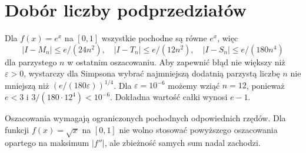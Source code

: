 \section{Dobór liczby podprzedziałów}
\begin{przyklad}
\label{ma1:ex:quadrature-exp}
Dla $f(x)=e^x$ na $[0,1]$ wszystkie pochodne są równe $e^x$, więc
\[
 |I-M_n|\le e/(24n^2),\quad
 |I-T_n|\le e/(12n^2),\quad
 |I-S_n|\le e/(180n^4)
\]
dla parzystego $n$ w ostatnim oszacowaniu. Aby zapewnić błąd nie większy niż $\varepsilon>0$, wystarczy dla Simpsona wybrać najmniejszą dodatnią parzystą liczbę $n$ nie mniejszą niż $(e/(180\varepsilon))^{1/4}$. Dla $\varepsilon=10^{-6}$ możemy wziąć $n=12$, ponieważ $e<3$ i $3/(180\cdot12^4)<10^{-6}$. Dokładna wartość całki wynosi $e-1$.
\end{przyklad}
Oszacowania wymagają ograniczonych pochodnych odpowiednich rzędów. Dla funkcji $f(x)=\sqrt x$ na $[0,1]$ nie wolno stosować powyższego oszacowania opartego na maksimum $|f''|$, ale zbieżność samych sum nadal zachodzi.

